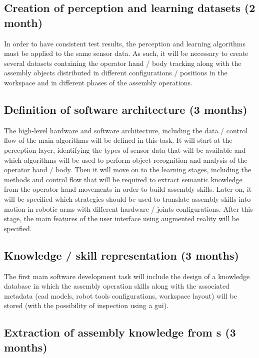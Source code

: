 \subsection{Creation of perception and learning datasets (2 month)}

In order to have consistent test results, the perception and learning algorithms must be applied to the same sensor data. As such, it will be necessary to create several datasets containing the operator hand / body tracking along with the assembly objects distributed in different configurations / positions in the workspace and in different phases of the assembly operations.


\subsection{Definition of software architecture (3 months)}

The high-level hardware and software architecture, including the data / control flow of the main algorithms will be defined in this task. It will start at the perception layer, identifying the types of sensor data that will be available and which algorithms will be used to perform object recognition and analysis of the operator hand / body. Then it will move on to the learning stages, including the methods and control flow that will be required to extract semantic knowledge from the operator hand movements in order to build assembly skills. Later on, it will be specified which strategies should be used to translate assembly skills into motion in robotic arms with different hardware / joints configurations. After this stage, the main features of the user interface using augmented reality will be specified.


\subsection{Knowledge / skill representation (3 months)}

The first main software development task will include the design of a knowledge database in which the assembly operation skills along with the associated metadata (\gls{cad} models, robot tools configurations, workspace layout) will be stored (with the possibility of inspection using a \gls{gui}).


\subsection{Extraction of assembly knowledge from s (3 months)}


